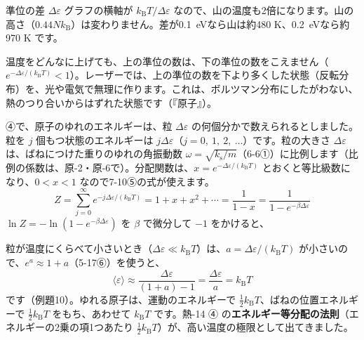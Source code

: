 \begin{phbaisuru}{準位の差 $\Delta\varepsilon$}
グラフの横軸が $k_{\mathrm B}T/\Delta\varepsilon$ なので、山の温度も2倍になります。山の高さ（$0.44Nk_{\mathrm B}$）は変わりません。差が\qty{0.1}{eV}なら山は約480 K、\qty{0.2}{eV}なら約970 K です。
\end{phbaisuru}
\begin{seikaku}
温度をどんなに上げても、上の準位の数は、下の準位の数をこえません（$e^{-\Delta\varepsilon/(k_{\mathrm B}T)}<1$）。レーザーでは、上の準位の数を下より多くした状態（反転分布）を、光や電気で無理に作ります。これは、ボルツマン分布にしたがわない、熱のつり合いからはずれた状態です（『原子』）。
\end{seikaku}

\label{ph:熱-15:sec8}
④で、原子のゆれのエネルギーは、粒 $\Delta\varepsilon$ の何個分かで数えられるとしました。粒を $j$ 個もつ状態のエネルギーは $j\Delta\varepsilon$（$j=0,\ 1,\ 2,\ \ldots$）です。粒の大きさ $\Delta\varepsilon$ は、ばねにつけた重りのゆれの角振動数 $\omega=\sqrt{k_{\mathrm s}/m}$（6-6①）に比例します（比例の係数は、原-2・原-6で）。分配関数は、$x=e^{-\Delta\varepsilon/(k_{\mathrm B}T)}$ とおくと等比級数になり、$0<x<1$ なので7-10⑤の式が使えます。
\[Z=\sum_{j=0}^{\infty}e^{-j\Delta\varepsilon/(k_{\mathrm B}T)}=1+x+x^2+\cdots=\frac{1}{1-x}=\frac{1}{1-e^{-\beta\Delta\varepsilon}}\]
$\ln Z=-\ln(1-e^{-\beta\Delta\varepsilon})$ を $\beta$ で微分して $-1$ をかけると、

粒が温度にくらべて小さいとき（$\Delta\varepsilon\ll k_{\mathrm B}T$）は、$a=\Delta\varepsilon/(k_{\mathrm B}T)$ が小さいので、$e^a\approx1+a$（5-17⑥）を使うと、
\[\langle\varepsilon\rangle\approx\frac{\Delta\varepsilon}{(1+a)-1}=\frac{\Delta\varepsilon}{a}=k_{\mathrm B}T\]
です（例題10）。ゆれる原子は、運動のエネルギーで $\tfrac{1}{2}k_{\mathrm B}T$、ばねの位置エネルギーで $\tfrac{1}{2}k_{\mathrm B}T$ をもち、あわせて $k_{\mathrm B}T$ です。熱-14 ④ の\textbf{エネルギー等分配の法則}（エネルギーの2乗の項1つあたり $\tfrac{1}{2}k_{\mathrm B}T$）が、高い温度の極限として出てきました。

